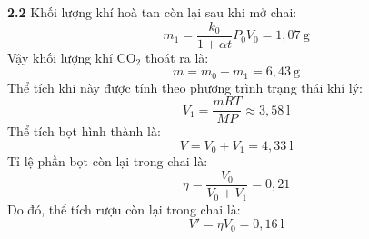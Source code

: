 \noindent\textbf{2.2} Khối lượng khí hoà tan còn lại sau khi mở chai:
\begin{equation*}
  m_1 = \frac{k_0}{1 + \alpha t} P_0 V_0 = 1{,}07~\text{g}
\end{equation*}
Vậy khối lượng khí $\text{CO}_2$ thoát ra là:
\begin{equation*}
  m = m_0 - m_1 = 6{,}43~\text{g}
\end{equation*}
Thể tích khí này được tính theo phương trình trạng thái khí lý:
\begin{equation*}
  V_1 = \frac{mRT}{MP} \approx 3{,}58~\text{l}
\end{equation*}
Thể tích bọt hình thành là:
\begin{equation*}
  V = V_0 + V_1 = 4{,}33~\text{l}
\end{equation*}
Tỉ lệ phần bọt còn lại trong chai là:
\begin{equation*}
  \eta = \frac{V_0}{V_0 + V_1} = 0{,}21
\end{equation*}
Do đó, thể tích rượu còn lại trong chai là:
\begin{equation*}
  V' = \eta V_0 = 0{,}16~\text{l}
\end{equation*}

